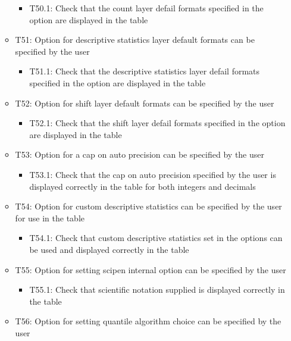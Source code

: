 \documentclass[
]{article}
\providecommand{\tightlist}{%
  \setlength{\itemsep}{0pt}\setlength{\parskip}{0pt}}
\begin{document}
\begin{itemize}
\begin{itemize}
    \begin{itemize}
    \tightlist
    \item
      T50.1: Check that the count layer defail formats specified in the
      option are displayed in the table
    \end{itemize}
  \item
    T51: Option for descriptive statistics layer default formats can be
    specified by the user

    \begin{itemize}
    \tightlist
    \item
      T51.1: Check that the descriptive statistics layer defail formats
      specified in the option are displayed in the table
    \end{itemize}
  \item
    T52: Option for shift layer default formats can be specified by the
    user

    \begin{itemize}
    \tightlist
    \item
      T52.1: Check that the shift layer defail formats specified in the
      option are displayed in the table
    \end{itemize}
  \item
    T53: Option for a cap on auto precision can be specified by the user

    \begin{itemize}
    \tightlist
    \item
      T53.1: Check that the cap on auto precision specified by the user
      is displayed correctly in the table for both integers and decimals
    \end{itemize}
  \item
    T54: Option for custom descriptive statistics can be specified by
    the user for use in the table

    \begin{itemize}
    \tightlist
    \item
      T54.1: Check that custom descriptive statistics set in the options
      can be used and displayed correctly in the table
    \end{itemize}
  \item
    T55: Option for setting scipen internal option can be specified by
    the user

    \begin{itemize}
    \tightlist
    \item
      T55.1: Check that scientific notation supplied is displayed
      correctly in the table
    \end{itemize}
  \item
    T56: Option for setting quantile algorithm choice can be specified
    by the user


\end{itemize}
\end{itemize}
\end{document}
